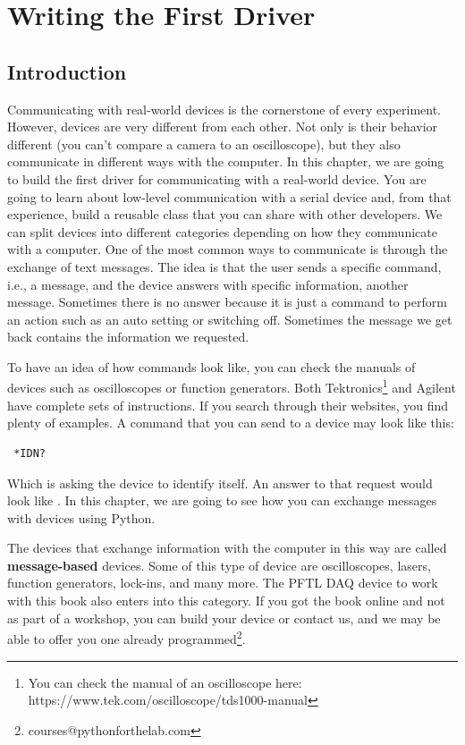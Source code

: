 \chapter{Writing the First Driver}\label{ch:first-driver}

\section{Introduction}\label{sec:driver-introduction}
Communicating with real-world devices is the cornerstone of every experiment. However, devices are very different from each other. Not only is their behavior different (you can't compare a camera to an oscilloscope), but they also communicate in different ways with the computer. In this chapter, we are going to build the first driver for communicating with a real-world device. You are going to learn about low-level communication with a serial device and, from that experience, build a reusable class that you can share with other developers.
We can split devices into different categories depending on how they communicate with a computer. One of the most common ways to communicate is through the exchange of text messages. The idea is that the user sends a specific command, i.e., a message, and the device answers with specific information, another message. Sometimes there is no answer because it is just a command to perform an action such as an auto setting or switching off. Sometimes the message we get back contains the information we requested.

To have an idea of how commands look like, you can check the manuals of devices such as oscilloscopes or function generators. Both Tektronics\footnote{You can check the manual of an oscilloscope here: https://www.tek.com/oscilloscope/tds1000-manual} and Agilent have complete sets of instructions. If you search through their websites, you find plenty of examples. A command that you can send to a device may look like this:

\begin{verbatim}
 *IDN?
\end{verbatim}

Which is asking the device to identify itself. An answer to that request would look like . In this chapter, we are going to see how you can exchange messages with devices using Python.

The devices that exchange information with the computer in this way are called \textbf{message-based} devices. Some of this type of device are oscilloscopes, lasers, function generators, lock-ins, and many more. The {PFTL DAQ} device to work with this book also enters into this category. If you got the book online and not as part of a workshop, you can build your device or contact us, and we may be able to offer you one already programmed\footnote{courses@pythonforthelab.com}.

